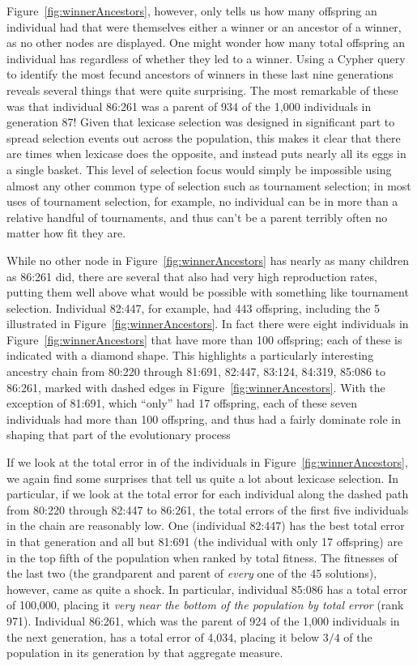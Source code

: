 Figure~\ref{fig:winnerAncestors},
however, only tells us how many offspring an individual had that were themselves either a winner
or an ancestor of a winner, as no other nodes are displayed. One
might wonder how many total offspring an individual has
regardless of whether they led to a winner. Using a Cypher query to identify the most
fecund ancestors of winners in these last nine generations reveals several things that were
quite surprising. The most remarkable of these was that individual 86:261 
was a parent of 934 of the 1,000 individuals in generation 87! Given that lexicase selection was
designed in significant part to spread selection events out across the population, this makes it
clear that there are times when lexicase does the opposite, and instead puts nearly all its eggs in
a single basket. This level of selection focus would simply be impossible using almost any other
common type of selection such as tournament selection; in most uses of tournament selection, 
for example, no individual can be in more than a relative handful of tournaments, and thus can't be
a parent terribly often no matter how fit they are.

While no other node in Figure~\ref{fig:winnerAncestors} has nearly as many children as 86:261 did,
there are several that also had very high reproduction rates, putting them well above what would be 
possible with something like tournament selection. Individual 82:447, for example, had
443 offspring, including the 5 illustrated in Figure~\ref{fig:winnerAncestors}. In fact there were
eight individuals in Figure~\ref{fig:winnerAncestors} that have more than 100 offspring; each of
these is indicated with a diamond shape. This highlights a particularly
interesting ancestry chain from 80:220 through 81:691, 82:447, 83:124, 84:319, 85:086 to 86:261, marked with
dashed edges in Figure~\ref{fig:winnerAncestors}. With the exception of 81:691, which ``only'' had 17
offspring, each of these seven individuals had more
than 100 offspring, and thus had a fairly dominate role in shaping that part of the evolutionary process

If we look at the total error in of the individuals in Figure~\ref{fig:winnerAncestors}, we again
find some surprises that tell us quite a lot about lexicase selection. In particular, if
we look at the total error for each individual along the dashed path from 80:220 through
82:447 to 86:261, the total errors of the first five
individuals in the chain are reasonably low. One (individual 82:447) has the best total error in
that generation and all but 81:691 (the individual with only 17 offspring) are in the top fifth of the 
population when ranked by total fitness. The fitnesses 
of the last two (the grandparent and parent of \emph{every} one of the 45 solutions), however, 
came as quite a shock. In particular, individual 85:086 has a total error of 100,000, placing it
\emph{very near the bottom of the population by total error} (rank 971). Individual 86:261, which was
the parent of 924 of the 1,000 individuals in the next generation, has a total error of 4,034, placing
it below $3/4$ of the population in its generation by that aggregate measure.

